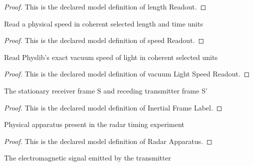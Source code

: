 \begin{proof}
  This is the declared model definition of length Readout.
\end{proof}
\begin{definition}
  \label{def:physics:phyx-mini-0593:phyxminiproblems-problemphyxmini0593-speedreadout}
  Read a physical speed in coherent selected length and time units
\end{definition}
\begin{proof}
  This is the declared model definition of speed Readout.
\end{proof}
\begin{definition}
  \label{def:physics:phyx-mini-0593:phyxminiproblems-problemphyxmini0593-vacuumlightspeedreadout}
  Read Physlib's exact vacuum speed of light in coherent selected units
\end{definition}
\begin{proof}
  This is the declared model definition of vacuum Light Speed Readout.
\end{proof}
\begin{definition}
  \label{def:physics:phyx-mini-0593:phyxminiproblems-problemphyxmini0593-inertialframelabel}
  The stationary receiver frame S and receding transmitter frame S'
\end{definition}
\begin{proof}
  This is the declared model definition of Inertial Frame Label.
\end{proof}
\begin{definition}
  \label{def:physics:phyx-mini-0593:phyxminiproblems-problemphyxmini0593-radarapparatus}
  Physical apparatus present in the radar timing experiment
\end{definition}
\begin{proof}
  This is the declared model definition of Radar Apparatus.
\end{proof}
\begin{definition}
  \label{def:physics:phyx-mini-0593:phyxminiproblems-problemphyxmini0593-signalkind}
  The electromagnetic signal emitted by the transmitter
\end{definition}
